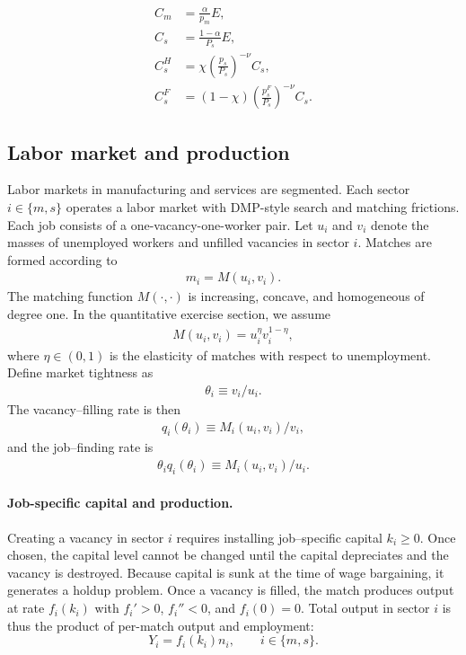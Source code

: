 \documentclass[12pt]{article} %
\theoremstyle{definition}
\begin{document}
 \begin{align}
C_m  &=   \frac{\alpha}{p_m}E,  \label{eq:Cm}  \\
C_s &= \frac{1-\alpha}{P_s}E, \\
C_s^{H} &  = \chi \left(\frac{p_s}{P_s}\right)^{-\nu} C_s, \\
C_s^{F} &  = (1-\chi) \left(\frac{p^F_s}{P_s}\right)^{-\nu} C_s.  \label{eq:CsF_def}
\end{align}

 




\subsection{Labor market and production}

Labor markets in manufacturing and services are segmented. Each sector $i \in \{m, s\}$ operates a  labor market with DMP-style search and matching frictions.  Each job consists of a one-vacancy-one-worker pair. Let $u_i$ and $v_i$ denote the masses of unemployed workers and unfilled vacancies in sector $i$.  Matches are formed according to  
\begin{align}
    m_i=M(u_i,v_i).
\end{align}
The matching function $M(\cdot, \cdot)$  is increasing, concave, and homogeneous of degree one.  In the quantitative exercise section, we assume
\begin{align}
    M(u_i,v_i)= u_i^\eta v_i^{1-\eta},
\end{align}
where $\eta\in (0,1)$ is the elasticity of matches with respect to unemployment. Define market tightness as
\begin{align}
    \theta_i\equiv v_i/u_i.
\end{align}
The vacancy–filling rate is then
\begin{align}
    q_i(\theta_i)\equiv M_i(u_i,v_i)/v_i,
\end{align}
and the job–finding rate is
\begin{align}
    \theta_i q_i(\theta_i)\equiv M_i(u_i,v_i)/u_i.
\end{align}




\paragraph{Job-specific capital and production.}
 Creating a vacancy in sector $i$ requires installing job–specific capital $k_i\ge 0$. Once chosen, the capital level cannot be changed until the capital depreciates and the vacancy is destroyed. Because capital is sunk at the time of wage bargaining, it generates a holdup problem.  
Once a vacancy is filled, the match produces output at rate $f_i(k_i)$ with $f_i'>0$, $f_i''<0$, and $f_i(0)=0$. %
Total output in sector $i$ is thus the product of per-match output and employment:
\begin{equation}\label{eq:Y_i}
    Y_i= f_i(k_i)n_i, \qquad i\in\{m,s\}.
\end{equation}
\end{document}
